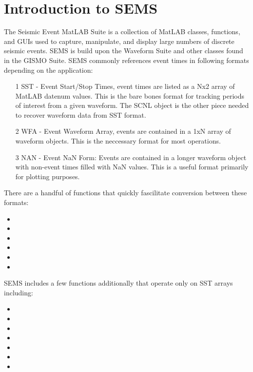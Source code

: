 \documentclass[11pt]{article}
\begin{document}
\maketitle

\clearpage

\tableofcontents

\clearpage

\section{Introduction to SEMS}

The Seismic Event MatLAB Suite is a collection of MatLAB classes, functions, and GUIs used to capture, manipulate, and display large numbers of discrete seismic events. SEMS is build upon the Waveform Suite and other classes found in the GISMO Suite. SEMS commonly references event times in following formats depending on the application:

\begin{enumerate}

\item[1] SST - Event Start/Stop Times, event times are listed as a Nx2 array of MatLAB datenum values. This is the bare bones format for tracking periods of interest from a given waveform. The SCNL object is the other piece needed to recover waveform data from SST format.

\item[2] WFA - Event Waveform Array, events are contained in a 1xN array of waveform objects. This is the neccessary format for most operations.

\item[3] NAN - Event NaN Form: Events are contained in a longer waveform object with non-event times filled with NaN values. This is a useful format primarily for plotting purposes.

\end{enumerate}

There are a handful of functions that quickly fascilitate conversion between these formats: 
\begin{itemize}
\item {}
\item {}
\item {}
\item {}
\item {}
\item {}
\end{itemize}
SEMS includes a few functions additionally that operate only on SST arrays including: 
\begin{itemize}
\item {}
\item {}
\item {}
\item {}
\item {}
\item {}
\item {}
\end{itemize}
\end{document}
